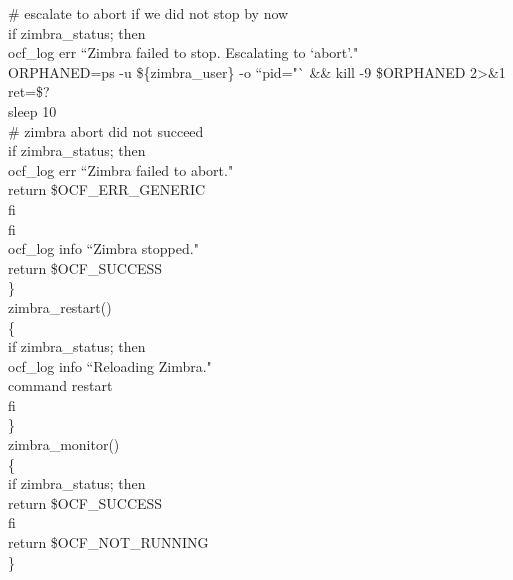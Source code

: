 \documentclass[a4paper, 12pt]{book}
\begin{document}
    \indent \# escalate to abort if we did not stop by now\\
    \indent if zimbra\_status; then\\
        \indent \indent ocf\_log err ``Zimbra failed to stop. Escalating to `abort'."\\

        \indent \indent ORPHANED=\textasciigrave ps -u \$\{zimbra\_user\} -o ``pid="` \&\& kill -9 \$ORPHANED 2\textgreater\&1\\
        \indent \indent ret=\$?\\
        \indent \indent sleep 10\\

        \indent \indent \# zimbra abort did not succeed\\
        \indent \indent if zimbra\_status; then\\
            \indent \indent \indent ocf\_log err ``Zimbra failed to abort."\\
            \indent \indent \indent return \$OCF\_ERR\_GENERIC\\
        \indent \indent fi\\
    \indent fi\\

    \indent ocf\_log info ``Zimbra stopped."\\
    \indent return \$OCF\_SUCCESS\\
\}\\

\noindent zimbra\_restart()\\
\{\\
    \indent if zimbra\_status; then\\
        \indent \indent ocf\_log info ``Reloading Zimbra."\\
        \indent \indent command restart\\
    \indent fi\\
\}\\

\noindent zimbra\_monitor()\\
\{\\
    \indent if zimbra\_status; then\\
        \indent \indent return \$OCF\_SUCCESS\\
    \indent fi\\
    \indent return \$OCF\_NOT\_RUNNING\\
\}\\
\end{document}
